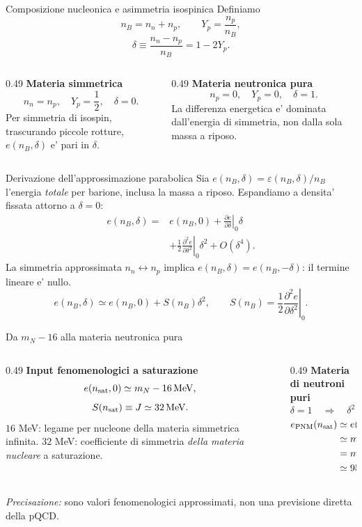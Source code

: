 \begin{frame}{Composizione nucleonica e asimmetria isospinica}
\small
Definiamo
\[
n_B=n_n+n_p,\qquad Y_p=\frac{n_p}{n_B},
\]
\[
\delta\equiv\frac{n_n-n_p}{n_B}=1-2Y_p.
\]
\begin{columns}[T,onlytextwidth]
\begin{column}{0.49\textwidth}
\textbf{Materia simmetrica}
\[
n_n=n_p,\quad Y_p=\frac12,\quad\delta=0.
\]
Per simmetria di isospin, trascurando piccole rotture, $e(n_B,\delta)$ e' pari in $\delta$.
\end{column}
\begin{column}{0.49\textwidth}
\textbf{Materia neutronica pura}
\[
n_p=0,\quad Y_p=0,\quad\delta=1.
\]
La differenza energetica e' dominata dall'energia di simmetria, non dalla sola massa a riposo.
\end{column}
\end{columns}
\end{frame}

\begin{frame}{Derivazione dell'approssimazione parabolica}
\small
Sia $e(n_B,\delta)=\varepsilon(n_B,\delta)/n_B$ l'energia \emph{totale} per barione, inclusa la massa a riposo.
\medskip
Espandiamo a densita' fissata attorno a $\delta=0$:
\[
\begin{aligned}
e(n_B,\delta)={}&e(n_B,0)
+\left.\frac{\partial e}{\partial\delta}\right|_0\delta\\
&+\frac12\left.\frac{\partial^2e}{\partial\delta^2}\right|_0\delta^2
+O(\delta^4).
\end{aligned}
\]
La simmetria approssimata $n_n\leftrightarrow n_p$ implica $e(n_B,\delta)=e(n_B,-\delta)$: il termine lineare e' nullo.
\[
{e(n_B,\delta)\simeq e(n_B,0)+S(n_B)\delta^2},
\qquad
S(n_B)=\frac12\left.\frac{\partial^2e}{\partial\delta^2}\right|_0.
\]
\end{frame}

\begin{frame}{Da $m_N-16$ alla materia neutronica pura}
\small
\begin{columns}[T,onlytextwidth]
\begin{column}{0.49\textwidth}
\textbf{Input fenomenologici a saturazione}
\[
e(n_{\rm sat},0)\simeq m_N-16\,\mathrm{MeV},
\]
\[
S(n_{\rm sat})\equiv J\simeq32\,\mathrm{MeV}.
\]
$16$ MeV: legame per nucleone della materia simmetrica infinita.
\medskip
$32$ MeV: coefficiente di simmetria \emph{della materia nucleare} a saturazione.
\end{column}
\begin{column}{0.49\textwidth}
\textbf{Materia di neutroni puri}
\[
\delta=1\quad\Longrightarrow\quad \delta^2=1.
\]
\[
\begin{aligned}
e_{\rm PNM}(n_{\rm sat})
&\simeq e(n_{\rm sat},0)+J\\
&\simeq m_N-16+32\\
&=m_N+16\\
&\simeq955\,\mathrm{MeV}.
\end{aligned}
\]
\end{column}
\end{columns}
\medskip
\textit{Precisazione:} sono valori fenomenologici approssimati, non una previsione diretta della pQCD.
\end{frame}

